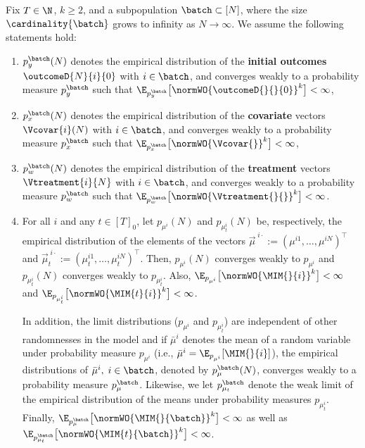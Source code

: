 % 
\begin{assumption}
    \label{asmp:weak_limits}
    Fix $T \in \N$, $k \geq 2$, and a subpopulation $\batch \subset [N]$, where the size $\cardinality{\batch}$ grows to infinity as $N \rightarrow \infty$. We assume the following statements hold:
    \begin{enumerate}[label=(\roman*)]
        \item $p_{y}^{\batch}(N)$ denotes the empirical distribution of the \textbf{initial outcomes} $\outcomeD{N}{i}{0}$ with $i \in \batch$, and converges weakly to a probability measure $p_{y}^{\batch}$ such that $\E_{p_{y}^{\batch}} \big[\normWO{\outcomeD{}{}{0}}^k\big]< \infty$,

        \item $p_{x}^{\batch}(N)$ denotes the empirical distribution of the \textbf{covariate} vectors $\Vcovar{i}(N)$ with $i \in \batch$, and converges weakly to a probability measure $p_{x}^{\batch}$ such that $\E_{p_{x}^{\batch}} \big[\normWO{\Vcovar{}}^k\big]< \infty$,

        \item $p_{w}^{\batch}(N)$ denotes the empirical distribution of the \textbf{treatment} vectors $\Vtreatment{i}{N}$ with $i \in \batch$, and converges weakly to a probability measure $p_{w}^{\batch}$ such that $\E_{p_{w}^{\batch}} \big[\normWO{\Vtreatment{}{}}^k\big]< \infty$.
        
        \item \label{asmp:interference_element_convergence} For all $i$ and any $t\in [T]_0$, let $p_{\mu^i}(N)$ and $p_{\mu_t^i}(N)$ be, respectively, the empirical distribution of the elements of the vectors $\Vec{\mu}^{\;i\cdot} := (\mu^{i1}, \ldots, \mu^{iN})^\top$ and $\Vec{\mu}^{\;i\cdot}_t := (\mu^{i1}_t, \ldots, \mu^{iN}_t)^\top$. Then, $p_{\mu^i}(N)$ converges weakly to $p_{\mu^i}$ and $p_{\mu_t^i}(N)$ converges weakly to $p_{\mu_t^i}$. Also, $\E_{p_{\mu^i}} \big[\normWO{\MIM{}{i}}^k\big]< \infty$ and $\E_{p_{\mu^i_t}} \big[\normWO{\MIM{t}{i}}^k\big]< \infty$.
        
        In addition, the limit distributions ($p_{\mu^i}$ and $p_{\mu^i_t}$) are independent of other randomnesses in the model and if $\bar{\mu}^i$ denotes the mean of a random variable under probability measure $p_{\mu^i}$ (i.e., $\bar{\mu}^i = \E_{p_{\mu^i}}[\MIM{}{i}]$), the empirical distributions of $\bar{\mu}^i,\; i \in \batch$, denoted by $p_{\mu}^{\batch}(N)$, converges weakly to a probability measure $p_{\mu}^{\batch}$. Likewise, we let $p_{\mu_t}^{\batch}$ denote the weak limit of the empirical distribution of the means under probability measures $p_{\mu^i_t}$. Finally, $\E_{p_{\mu}^{\batch}} \big[\normWO{\MIM{}{\batch}}^k\big]< \infty$ as well as $\E_{p_{\mu_t}^{\batch}} \big[\normWO{\MIM{t}{\batch}}^k\big]< \infty$.


\end{enumerate}
\end{assumption}
